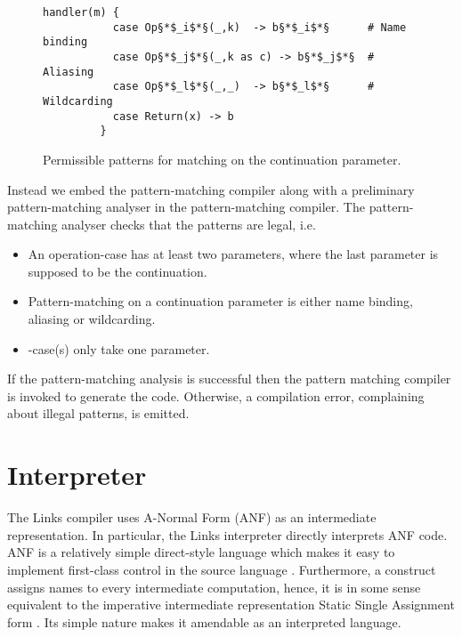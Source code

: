\begin{figure}[H]
\begin{center}
\begin{lstlisting}[style=links]
         handler(m) {
           case Op§*$_i$*§(_,k)  -> b§*$_i$*§      # Name binding
           case Op§*$_j$*§(_,k as c) -> b§*$_j$*§  # Aliasing
           case Op§*$_l$*§(_,_)  -> b§*$_l$*§      # Wildcarding
           case Return(x) -> b
         }
\end{lstlisting}        
\end{center}
\caption{Permissible patterns for matching on the continuation parameter.}\label{fig:cont-pattern-matching}
\end{figure}

Instead we embed the  pattern-matching compiler along with a preliminary pattern-matching analyser in the  pattern-matching compiler. The pattern-matching analyser checks that the patterns are legal, i.e.
\begin{itemize}
  \item An operation-case has at least two parameters, where the last parameter is supposed to be the continuation.
  \item Pattern-matching on a continuation parameter is either name binding, aliasing or wildcarding.
  \item {}-case(s) only take one parameter.
\end{itemize}
If the pattern-matching analysis is successful then the  pattern matching compiler is invoked to generate the code. Otherwise, a compilation error, complaining about illegal patterns, is emitted.

\section{Interpreter}

The Links compiler uses A-Normal Form (ANF) as an intermediate representation. In particular, the Links interpreter directly interprets ANF code.
ANF is a relatively simple direct-style language which makes it easy to implement first-class control in the source language \cite{Flanagan1993}. Furthermore, a  construct assigns names to every intermediate computation, hence, it is in some sense equivalent to the imperative intermediate representation Static Single Assignment form \cite{Flanagan1993}. Its simple nature makes it amendable as an interpreted language.

